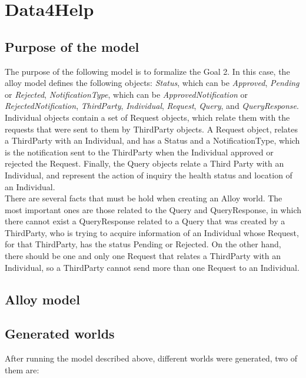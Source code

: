 \documentclass[a4paper, hidelinks, 12pt]{report}
\begin{document}
	\section{Data4Help}
	\subsection{Purpose of the model}
	The purpose of the following model is to formalize the Goal 2. In this case, the alloy model defines the following objects: \textit{Status}, which can be \textit{Approved}, \textit{Pending} or \textit{Rejected}, \textit{NotificationType}, which can be \textit{ApprovedNotification} or \textit{RejectedNotification}, \textit{ThirdParty}, \textit{Individual}, \textit{Request}, \textit{Query}, and \textit{QueryResponse}. Individual objects contain a set of Request objects, which relate them with the requests that were sent to them by ThirdParty objects. A Request object, relates a ThirdParty with an Individual, and has a Status and a NotificationType, which is the notification sent to the ThirdParty when the Individual approved or rejected the Request. Finally, the Query objects relate a Third Party with an Individual, and represent the action of inquiry the health status and location of an Individual.\\

	There are several facts that must be hold when creating an Alloy world. The most important ones are those related to the Query and QueryResponse, in which there cannot exist a QueryResponse related to a Query that was created by a ThirdParty, who is trying to acquire information of an Individual whose Request, for that ThirdParty, has the status Pending or Rejected. On the other hand, there should be one and only one Request that relates a ThirdParty with an Individual, so a ThirdParty cannot send more than one Request to an Individual.
	
	\subsection{Alloy model}
	\vspace{2 mm}
	
	
	
	\vspace{8 mm}
	
	\subsection{Generated worlds}
	After running the model described above, different worlds were generated, two of them are:
	
\end{document}
